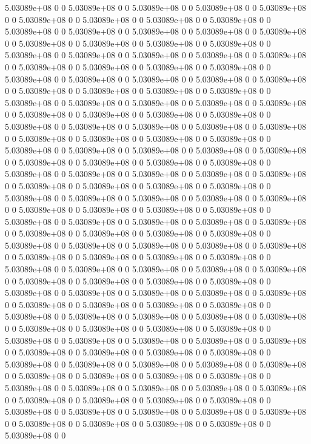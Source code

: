5.03089e+08 0 0
5.03089e+08 0 0
5.03089e+08 0 0
5.03089e+08 0 0
5.03089e+08 0 0
5.03089e+08 0 0
5.03089e+08 0 0
5.03089e+08 0 0
5.03089e+08 0 0
5.03089e+08 0 0
5.03089e+08 0 0
5.03089e+08 0 0
5.03089e+08 0 0
5.03089e+08 0 0
5.03089e+08 0 0
5.03089e+08 0 0
5.03089e+08 0 0
5.03089e+08 0 0
5.03089e+08 0 0
5.03089e+08 0 0
5.03089e+08 0 0
5.03089e+08 0 0
5.03089e+08 0 0
5.03089e+08 0 0
5.03089e+08 0 0
5.03089e+08 0 0
5.03089e+08 0 0
5.03089e+08 0 0
5.03089e+08 0 0
5.03089e+08 0 0
5.03089e+08 0 0
5.03089e+08 0 0
5.03089e+08 0 0
5.03089e+08 0 0
5.03089e+08 0 0
5.03089e+08 0 0
5.03089e+08 0 0
5.03089e+08 0 0
5.03089e+08 0 0
5.03089e+08 0 0
5.03089e+08 0 0
5.03089e+08 0 0
5.03089e+08 0 0
5.03089e+08 0 0
5.03089e+08 0 0
5.03089e+08 0 0
5.03089e+08 0 0
5.03089e+08 0 0
5.03089e+08 0 0
5.03089e+08 0 0
5.03089e+08 0 0
5.03089e+08 0 0
5.03089e+08 0 0
5.03089e+08 0 0
5.03089e+08 0 0
5.03089e+08 0 0
5.03089e+08 0 0
5.03089e+08 0 0
5.03089e+08 0 0
5.03089e+08 0 0
5.03089e+08 0 0
5.03089e+08 0 0
5.03089e+08 0 0
5.03089e+08 0 0
5.03089e+08 0 0
5.03089e+08 0 0
5.03089e+08 0 0
5.03089e+08 0 0
5.03089e+08 0 0
5.03089e+08 0 0
5.03089e+08 0 0
5.03089e+08 0 0
5.03089e+08 0 0
5.03089e+08 0 0
5.03089e+08 0 0
5.03089e+08 0 0
5.03089e+08 0 0
5.03089e+08 0 0
5.03089e+08 0 0
5.03089e+08 0 0
5.03089e+08 0 0
5.03089e+08 0 0
5.03089e+08 0 0
5.03089e+08 0 0
5.03089e+08 0 0
5.03089e+08 0 0
5.03089e+08 0 0
5.03089e+08 0 0
5.03089e+08 0 0
5.03089e+08 0 0
5.03089e+08 0 0
5.03089e+08 0 0
5.03089e+08 0 0
5.03089e+08 0 0
5.03089e+08 0 0
5.03089e+08 0 0
5.03089e+08 0 0
5.03089e+08 0 0
5.03089e+08 0 0
5.03089e+08 0 0
5.03089e+08 0 0
5.03089e+08 0 0
5.03089e+08 0 0
5.03089e+08 0 0
5.03089e+08 0 0
5.03089e+08 0 0
5.03089e+08 0 0
5.03089e+08 0 0
5.03089e+08 0 0
5.03089e+08 0 0
5.03089e+08 0 0
5.03089e+08 0 0
5.03089e+08 0 0
5.03089e+08 0 0
5.03089e+08 0 0
5.03089e+08 0 0
5.03089e+08 0 0
5.03089e+08 0 0
5.03089e+08 0 0
5.03089e+08 0 0
5.03089e+08 0 0
5.03089e+08 0 0
5.03089e+08 0 0
5.03089e+08 0 0
5.03089e+08 0 0
5.03089e+08 0 0
5.03089e+08 0 0
5.03089e+08 0 0
5.03089e+08 0 0
5.03089e+08 0 0
5.03089e+08 0 0
5.03089e+08 0 0
5.03089e+08 0 0
5.03089e+08 0 0
5.03089e+08 0 0
5.03089e+08 0 0
5.03089e+08 0 0
5.03089e+08 0 0
5.03089e+08 0 0
5.03089e+08 0 0
5.03089e+08 0 0
5.03089e+08 0 0
5.03089e+08 0 0
5.03089e+08 0 0
5.03089e+08 0 0
5.03089e+08 0 0
5.03089e+08 0 0
5.03089e+08 0 0
5.03089e+08 0 0
5.03089e+08 0 0
5.03089e+08 0 0
5.03089e+08 0 0
5.03089e+08 0 0
5.03089e+08 0 0
5.03089e+08 0 0
5.03089e+08 0 0
5.03089e+08 0 0
5.03089e+08 0 0
5.03089e+08 0 0
5.03089e+08 0 0
5.03089e+08 0 0
5.03089e+08 0 0
5.03089e+08 0 0
